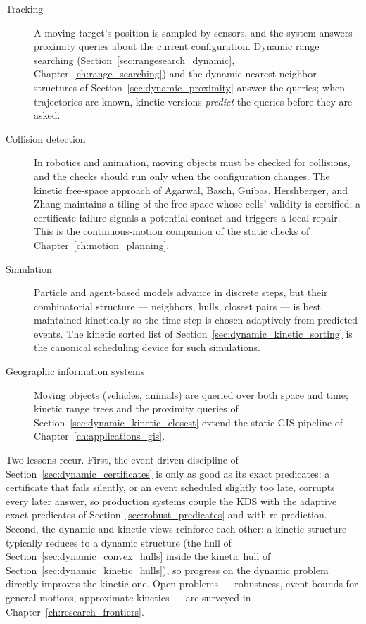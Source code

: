 \begin{description}
  \item[Tracking] A moving target's position is sampled by sensors, and the
    system answers proximity queries about the current configuration.
    Dynamic range searching (Section~\ref{sec:rangesearch_dynamic},
    Chapter~\ref{ch:range_searching}) and the dynamic nearest-neighbor
    structures of Section~\ref{sec:dynamic_proximity} answer the queries;
    when trajectories are known, kinetic versions \emph{predict} the queries
    before they are asked.
  \item[Collision detection] In robotics and animation, moving objects must
    be checked for collisions, and the checks should run only when the
    configuration changes. The kinetic free-space approach of Agarwal,
    Basch, Guibas, Hershberger, and Zhang \cite{agarwal2002kinetic}
    maintains a tiling of the free space whose cells' validity is certified;
    a certificate failure signals a potential contact and triggers a local
    repair. This is the continuous-motion companion of the static checks of
    Chapter~\ref{ch:motion_planning}.
  \item[Simulation] Particle and agent-based models advance in discrete
    steps, but their combinatorial structure --- neighbors, hulls, closest
    pairs --- is best maintained kinetically so the time step is chosen
    adaptively from predicted events. The kinetic sorted list of
    Section~\ref{sec:dynamic_kinetic_sorting} is the canonical scheduling
    device for such simulations.
  \item[Geographic information systems] Moving objects (vehicles, animals)
    are queried over both space and time; kinetic range trees and the
    proximity queries of Section~\ref{sec:dynamic_kinetic_closest} extend
    the static GIS pipeline of Chapter~\ref{ch:applications_gis}.
\end{description}

Two lessons recur. First, the event-driven discipline of
Section~\ref{sec:dynamic_certificates} is only as good as its exact
predicates: a certificate that fails silently, or an event scheduled
slightly too late, corrupts every later answer, so production systems couple
the KDS with the adaptive exact predicates of
Section~\ref{sec:robust_predicates} and with re-prediction. Second, the
dynamic and kinetic views reinforce each other: a kinetic structure typically
reduces to a dynamic structure (the hull of Section~\ref{sec:dynamic_convex_hulls}
inside the kinetic hull of Section~\ref{sec:dynamic_kinetic_hulls}), so
progress on the dynamic problem directly improves the kinetic one. Open
problems --- robustness, event bounds for general motions, approximate
kinetics --- are surveyed in Chapter~\ref{ch:research_frontiers}.

